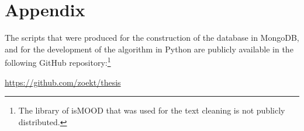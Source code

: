 \chapter*{Appendix}
\label{apdx:appendix}

The scripts that were produced
for the construction of the database in MongoDB,
and for the development of the algorithm in Python
are publicly available in the following GitHub repository:\footnote {The library of isMOOD
that was used for the text cleaning is not publicly distributed.}

\url{https://github.com/zoekt/thesis}

